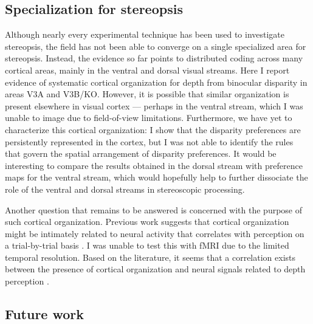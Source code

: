 \subsection*{Specialization for stereopsis}

Although nearly every experimental technique has been used to investigate stereopsis, the field has not been able to converge on a single specialized area for stereopsis. Instead, the evidence so far points to distributed coding across many cortical areas, mainly in the ventral and dorsal visual streams. Here I report evidence of systematic cortical organization for depth from binocular disparity in areas V3A and V3B/KO. However, it is possible that similar organization is present elsewhere in visual cortex --- perhaps in the ventral stream, which I was unable to image due to field-of-view limitations. Furthermore, we have yet to characterize this cortical organization: I show that the disparity preferences are persistently represented in the cortex, but I was not able to identify the rules that govern the spatial arrangement of disparity preferences. It would be interesting to compare the results obtained in the dorsal stream with preference maps for the ventral stream, which would hopefully help to further dissociate the role of the ventral and dorsal streams in stereoscopic processing.

Another question that remains to be answered is concerned with the purpose of such cortical organization. Previous work suggests that cortical organization might be intimately related to neural activity that correlates with perception on a trial-by-trial basis \cite{Nienborg:2014fu}. I was unable to test this with fMRI due to the limited temporal resolution. Based on the literature, it seems that a correlation exists between the presence of cortical organization and neural signals related to depth perception \cite{Clery:2015lh,Nienborg:2014fu,Nienborg:2007ly,Nienborg:2006qo,Shiozaki:2012ys,Uka:2004mg,DeAngelis:1998df}.


\subsection*{Future work}


